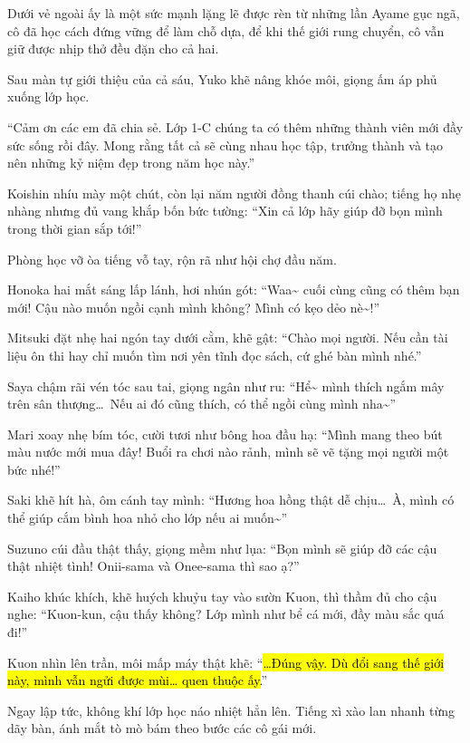 \documentclass[../main.tex]{subfiles}
\begin{document}
Dưới vẻ ngoài ấy là một sức mạnh lặng lẽ được rèn từ những lần Ayame gục ngã, cô đã học cách đứng vững để làm chỗ dựa, để khi thế giới rung chuyển, cô vẫn giữ được nhịp thở đều đặn cho cả hai.

\chrint

Sau màn tự giới thiệu của cả sáu, Yuko khẽ nâng khóe môi, giọng ấm áp phủ xuống lớp học.

``Cảm ơn các em đã chia sẻ. Lớp 1-C chúng ta có thêm những thành viên mới đầy sức sống rồi đây. Mong rằng tất cả sẽ cùng nhau học tập, trưởng thành và tạo nên những kỷ niệm đẹp trong năm học này.''

Koishin nhíu mày một chút, còn lại năm người đồng thanh cúi chào; tiếng họ nhẹ nhàng nhưng đủ vang khắp bốn bức tường: ``Xin cả lớp hãy giúp đỡ bọn mình trong thời gian sắp tới!''

Phòng học vỡ òa tiếng vỗ tay, rộn rã như hội chợ đầu năm.

Honoka hai mắt sáng lấp lánh, hơi nhún gót: ``Waa\~{} cuối cùng cũng có thêm bạn mới! Cậu nào muốn ngồi cạnh mình không? Mình có kẹo dẻo nè\~{}!''

Mitsuki đặt nhẹ hai ngón tay dưới cằm, khẽ gật: ``Chào mọi người. Nếu cần tài liệu ôn thi hay chỉ muốn tìm nơi yên tĩnh đọc sách, cứ ghé bàn mình nhé.''

Saya chậm rãi vén tóc sau tai, giọng ngân như ru: ``Hể\~{} mình thích ngắm mây trên sân thượng\dots\ Nếu ai đó cũng thích, có thể ngồi cùng mình nha\~{}''

Mari xoay nhẹ bím tóc, cười tươi như bông hoa đầu hạ: ``Mình mang theo bút màu nước mới mua đây! Buổi ra chơi nào rảnh, mình sẽ vẽ tặng mọi người một bức nhé!''

Saki khẽ hít hà, ôm cánh tay mình: ``Hương hoa hồng thật dễ chịu\dots\ À, mình có thể giúp cắm bình hoa nhỏ cho lớp nếu ai muốn\~{}''

Suzuno cúi đầu thật thấy, giọng mềm như lụa: ``Bọn mình sẽ giúp đỡ các cậu thật nhiệt tình! Onii-sama và Onee-sama thì sao ạ?''

Kaiho khúc khích, khẽ huých khuỷu tay vào sườn Kuon, thì thầm đủ cho cậu nghe: ``Kuon-kun, cậu thấy không? Lớp mình như bể cá mới, đầy màu sắc quá đi!''

Kuon nhìn lên trần, môi mấp máy thật khẽ: ``\hl{\dots Đúng vậy. Dù đổi sang thế giới này, mình vẫn ngửi được mùi\dots{} quen thuộc ấy.}''

\ct

Ngay lập tức, không khí lớp học náo nhiệt hẳn lên. Tiếng xì xào lan nhanh từng dãy bàn, ánh mắt tò mò bám theo bước các cô gái mới.
\end{document}
